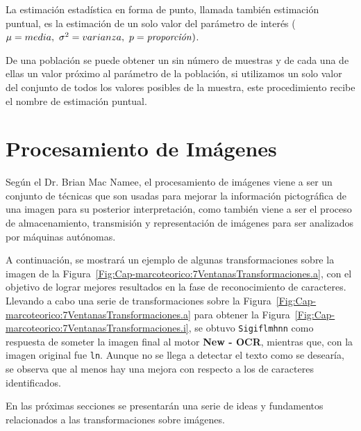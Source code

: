 	\begin{defn}
  La estimación estadística en forma de punto, llamada también estimación 
  puntual, es la estimación de un solo valor del parámetro de interés 
  ($\mu = media,~ \sigma^2 = varianza,~ p=\text{\textit{proporción}})$.
    
  De una población se puede obtener un sin número de muestras y de cada una 
  de ellas un valor próximo al parámetro de la población, si utilizamos un 
  solo valor del conjunto de todos los valores posibles de la muestra, este 
  procedimiento recibe el nombre de estimación puntual.
  \end{defn}

\section{Procesamiento de Imágenes}
Según el Dr. Brian Mac Namee, el procesamiento de imágenes viene a ser un 
conjunto de técnicas que son usadas para mejorar la información pictográfica 
de una imagen para su posterior interpretación, como también viene a ser el 
proceso de almacenamiento, transmisión y representación de imágenes para ser 
analizados por máquinas autónomas.

A continuación, se mostrará un ejemplo de algunas transformaciones sobre la 
imagen de la Figura~\ref{Fig:Cap-marcoteorico:7VentanasTransformaciones.a}, 
con el objetivo de lograr mejores resultados en la fase de reconocimiento de 
caracteres. Llevando a cabo una serie de transformaciones sobre la 
Figura~\ref{Fig:Cap-marcoteorico:7VentanasTransformaciones.a} para obtener 
la Figura~\ref{Fig:Cap-marcoteorico:7VentanasTransformaciones.i}, se obtuvo 
\texttt{Sigiflmhnn} como respuesta de someter la imagen final al motor 
\textbf{New - OCR}, mientras que, con la imagen original fue \texttt{ln}. 
Aunque no se llega a detectar el texto como se desearía, se observa que al 
menos hay una mejora con respecto a los de caracteres identificados.

En las próximas secciones se presentarán una serie de ideas y fundamentos 
relacionados a las transformaciones sobre imágenes.

